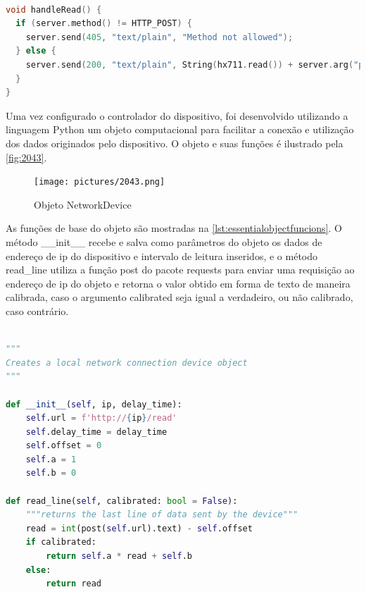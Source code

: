 \begin{lstlisting}[label={lst:handle_read},language=C++,caption={{Função de obtenção de sinal pelo módulo de conversão HX711}}]

void handleRead() {
  if (server.method() != HTTP_POST) {
    server.send(405, "text/plain", "Method not allowed");
  } else {
    server.send(200, "text/plain", String(hx711.read()) + server.arg("plain"));
  }
}

\end{lstlisting}

Uma vez configurado o controlador do dispositivo, foi desenvolvido utilizando a linguagem Python um objeto computacional para facilitar a conexão e utilização dos dados
originados pelo dispositivo.
O objeto e suas funções é ilustrado pela \autoref{fig:2043}.

\begin{figure}[htb]
	\caption{\label{fig:2043} Objeto NetworkDevice}
	\begin{center}
		\texttt{[image: pictures/2043.png]}
	\end{center}
\end{figure}

As funções de base do objeto são mostradas na \autoref{lst:essentialobjectfuncions}.
O método \_\_init\_\_ recebe e salva como parâmetros do objeto os dados de endereço de ip do dispositivo e intervalo de leitura inseridos,
e o método read\_line utiliza a função post do pacote requests para enviar uma requisição ao endereço de ip do objeto e retorna o valor obtido em forma de
texto de maneira calibrada, caso o argumento calibrated seja igual a verdadeiro, ou não calibrado, caso contrário.

\begin{lstlisting}[label={lst:essentialobjectfuncions},language=Python,caption={{Métodos base do objeto NetworkDevice}}]

"""
Creates a local network connection device object
"""

def __init__(self, ip, delay_time):
	self.url = f'http://{ip}/read'
	self.delay_time = delay_time
	self.offset = 0
	self.a = 1
	self.b = 0

def read_line(self, calibrated: bool = False):
	"""returns the last line of data sent by the device"""
	read = int(post(self.url).text) - self.offset
	if calibrated:
		return self.a * read + self.b
	else:
		return read

\end{lstlisting}

